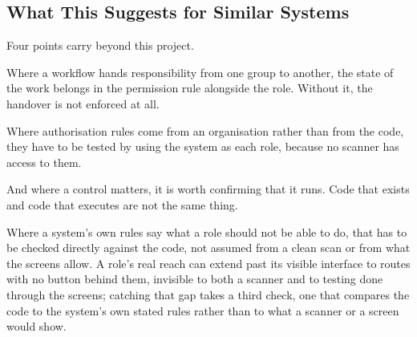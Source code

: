 \subsection{What This Suggests for Similar Systems}

Four points carry beyond this project.

Where a workflow hands responsibility from one group to another, the state of the work belongs in the permission rule alongside the role. Without it, the handover is not enforced at all.

Where authorisation rules come from an organisation rather than from the code, they have to be tested by using the system as each role, because no scanner has access to them.

And where a control matters, it is worth confirming that it runs. Code that exists and code that executes are not the same thing.

Where a system's own rules say what a role should not be able to do, that has to be checked directly against the code, not assumed from a clean scan or from what the screens allow. A role's real reach can extend past its visible interface to routes with no button behind them, invisible to both a scanner and to testing done through the screens; catching that gap takes a third check, one that compares the code to the system's own stated rules rather than to what a scanner or a screen would show.
